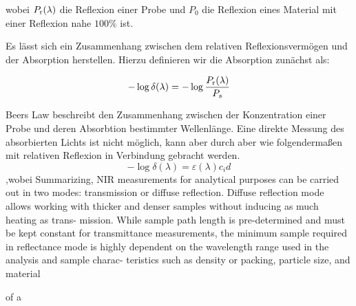 		wobei $P_{\mathrm{r}}(\lambda)$ die Reflexion einer Probe und $P_0$ die Reflexion eines Material mit einer Reflexion nahe $100\%$ ist.
		
		Es lässt sich ein Zusammenhang zwischen dem relativen Reflexionsvermögen und der Absorption herstellen.
		Hierzu definieren wir die Absorption zunächst als:
		
		\[
			-\log \delta(\lambda) = -\log \frac{P_{\mathrm{r}}(\lambda)}{P_s}
		\]
		
		Beers Law beschreibt den Zusammenhang zwischen der Konzentration einer Probe und deren Absorbtion bestimmter Wellenlänge.
		Eine direkte Messung des absorbierten Lichts ist nicht möglich, kann aber durch aber wie folgendermaßen mit relativen Reflexion in Verbindung gebracht werden.
		\[
			-\log \delta(\lambda) = \varepsilon(\lambda) c_i d
		\]
		,wobei 
		Summarizing, NIR measurements for analytical purposes
can be carried out in two modes: transmission or diffuse
reflection. Diffuse reflection mode allows working with thicker
and denser samples without inducing as much heating as trans-
mission. While sample path length is pre-determined and must
be kept constant for transmittance measurements, the minimum
sample required in reflectance mode is highly dependent on
the wavelength range used in the analysis and sample charac-
teristics such as density or packing, particle size, and material
		
		 
		
		of a 


